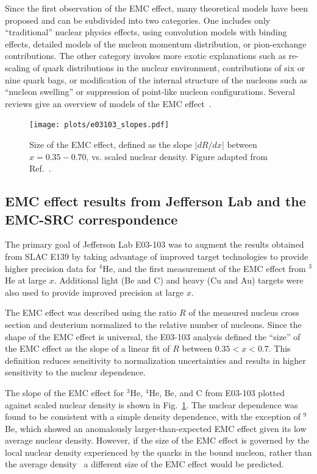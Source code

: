 Since the first observation of the EMC effect, many theoretical models have been proposed and can be subdivided into two categories.  One includes only ``traditional'' nuclear physics effects, using convolution models with binding effects, detailed models of the nucleon momentum distribution, or pion-exchange contributions. The other category invokes more exotic explanations such as re-scaling of quark distributions in the nuclear environment, contributions of six or nine
quark bags, or modification of the internal structure of the nucleons such as ``nucleon swelling'' or suppression of point-like nucleon configurations. Several reviews give an overview of models of the EMC effect~\cite{Geesaman:1995yd, Norton:2003cb, Piller:1999wx, Hen:2013oha, Malace:2014uea}.


\begin{figure}[tbp]
  \centering\texttt{[image: plots/e03103\_slopes.pdf]}
  \caption{Size of the EMC effect, defined as the slope $|dR/dx|$ between $x=0.35-0.70$, vs. scaled nuclear
    density. Figure adapted from Ref.~\cite{Seely:2009gt}.}
  \label{fig:emc_jlab_hallc}
\end{figure}

\subsection{EMC effect results from Jefferson Lab and the EMC-SRC correspondence}

The primary goal of Jefferson Lab E03-103 was to augment the results obtained from SLAC E139 by taking
advantage of improved target technologies to provide higher precision data for $^4$He, and the first
measurement of the EMC effect from $^3$He at large $x$.  Additional light (Be and C) and heavy (Cu and Au)
targets were also used to provide improved precision at large $x$.

The EMC effect was described using the ratio $R$ of the measured nucleus cross section and deuterium
normalized to the relative number of nucleons.
Since the shape of the EMC effect is universal, the E03-103 analysis defined the ``size'' of the EMC
effect as the slope of a linear fit of $R$ between $0.35<x<0.7$.  This definition reduces sensitivity to
normalization uncertainties and results in higher sensitivity to the nuclear dependence.

The slope of the EMC effect for $^3$He, $^4$He, Be, and C from E03-103 plotted against scaled nuclear
density is shown in Fig.~\ref{fig:emc_jlab_hallc}.  The nuclear dependence was found to be consistent
with a simple density dependence, with the exception of $^9$Be,  which showed an anomalously larger-than-expected 
EMC effect given its low average nuclear density.  However, if the size of the EMC effect is
governed by the local nuclear density experienced by the quarks in the bound nucleon, rather than the
average density~\cite{Seely:2009gt, PhysRevC.82.054614} a different size of the EMC effect would be predicted.

